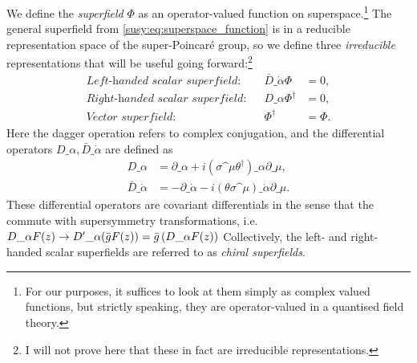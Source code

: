 \documentclass[../main.tex]{subfiles}
\begin{document}
We define the \emph{superfield} \(\Phi\) as an operator-valued function on
superspace.\footnote{For our purposes, it suffices to look at them simply as complex valued functions, but strictly speaking, they are operator-valued in a quantised field theory.} The general superfield from \cref{susy:eq:superspace_function} is in a
reducible representation space of the super-Poincaré group, so we define three
\emph{irreducible} representations that will be useful going forward:\footnote{I will not prove here that these in fact are irreducible representations.}
\begin{align}
  \textit{Left-handed scalar superfield:}  &  & \bar{D}\_{\dot\alpha}\Phi & = 0,    \\
  \textit{Right-handed scalar superfield:} &  & D\_{\alpha}\Phi^\dagger   & = 0,    \\
  \label{susy:eq:vector_superfield}
  \textit{Vector superfield:}              &  & \Phi^\dagger              & = \Phi.
\end{align}
Here the dagger operation refers to complex conjugation, and the differential operators \(D\_\alpha, \bar{D}\_{\dot\alpha}\) are defined as
\begin{subequations}
  \begin{align}
    D\_\alpha             & = \partial\_\alpha + i(\sigma\^\mu \theta^\dagger)\_\alpha \partial\_\mu,      \\
    \bar{D}\_{\dot\alpha} & = -\partial\_{\dot\alpha} - i (\theta\sigma\^\mu)\_{\dot\alpha} \partial\_\mu.
  \end{align}
\end{subequations}
These differential operators are covariant differentials in the sense that the commute with supersymmetry transformations, i.e. \(D\_\alpha F(z) \to {D^\prime}\_\alpha (\bar{g} F(z)) = \bar{g} \left(D\_\alpha F(z)\right)\)
Collectively, the left- and right-handed scalar superfields are referred to as \emph{chiral superfields}.
\end{document}
